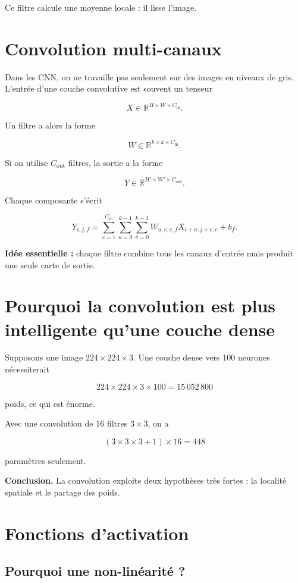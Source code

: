 \documentclass[11pt,a4paper]{article}
\begin{document}
Ce filtre calcule une moyenne locale : il lisse l'image.

\section{Convolution multi-canaux}

Dans les CNN, on ne travaille pas seulement sur des images en niveaux de gris. L'entrée d'une couche convolutive est souvent un tenseur

\[
X \in \mathbb{R}^{H \times W \times C_{\text{in}}}.
\]

Un filtre a alors la forme

\[
W \in \mathbb{R}^{k \times k \times C_{\text{in}}}.
\]

Si on utilise $C_{\text{out}}$ filtres, la sortie a la forme

\[
Y \in \mathbb{R}^{H' \times W' \times C_{\text{out}}}.
\]

Chaque composante s'écrit

\[
Y_{i,j,f} = \sum_{c=1}^{C_{\text{in}}}\sum_{u=0}^{k-1}\sum_{v=0}^{k-1} W_{u,v,c,f}X_{i+u,j+v,c} + b_f.
\]

\textbf{Idée essentielle :} chaque filtre combine tous les canaux d'entrée mais produit une seule carte de sortie.

\section{Pourquoi la convolution est plus intelligente qu'une couche dense}

Supposons une image $224 \times 224 \times 3$. Une couche dense vers 100 neurones nécessiterait

\[
224 \times 224 \times 3 \times 100 = 15\,052\,800
\]

poids, ce qui est énorme.

Avec une convolution de 16 filtres $3 \times 3$, on a

\[
(3 \times 3 \times 3 + 1) \times 16 = 448
\]

paramètres seulement.

\textbf{Conclusion.} La convolution exploite deux hypothèses très fortes : la localité spatiale et le partage des poids.

\section{Fonctions d'activation}

\subsection{Pourquoi une non-linéarité ?}
\end{document}
